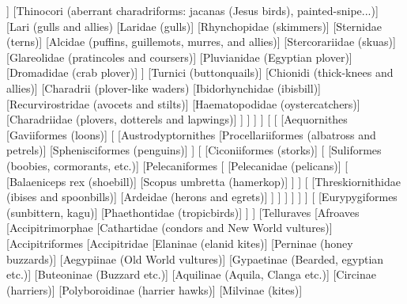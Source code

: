 \documentclass[tikz]{standalone}
\begin{document}
\begin{forest}
								]
								[{Thinocori (aberrant charadriforms: jacanas (Jesus birds), painted-snipe...)}]
								[{Lari (gulls and allies)}
									[{Laridae (gulls)}]
									[{Rhynchopidae (skimmers)}]
									[{Sternidae (terns)}]
									[{Alcidae (puffins, guillemots, murres, and allies)}]
									[{Stercorariidae (skuas)}]
									[{Glareolidae (pratincoles and coursers)}]
									[{Pluvianidae (Egyptian plover)}]
									[{Dromadidae (crab plover)}]
								]
								[{Turnici (buttonquails)}]
								[{Chionidi (thick-knees and allies)}]
								[{Charadrii (plover-like waders)}
									[{Ibidorhynchidae (ibisbill)}]
									[{Recurvirostridae (avocets and stilts)}]
									[{Haematopodidae (oystercatchers)}]
									[{Charadriidae (plovers, dotterels and lapwings)}]
								]
							]
		  				]
					]
		       			[
		 				[
							[{Aequornithes}
								[{Gaviiformes (loons)}]
								[
									[{Austrodyptornithes}
										[{Procellariiformes (albatross and petrels)}]
										[{Sphenisciformes (penguins)}]
									]
									[
										[{Ciconiiformes (storks)}]
										[
											[{Suliformes (boobies, cormorants, etc.)}]
											[{Pelecaniformes}
												[
													[{Pelecanidae (pelicans)}]
													[
														[{Balaeniceps rex (shoebill)}]
														[{Scopus umbretta (hamerkop)}]
													]
												]
												[
													[{Threskiornithidae (ibises and spoonbills)}]
													[{Ardeidae (herons and egrets)}]
												]
											]
										]
									]
								]
							]
			     				[
			     					[{Eurypygiformes (sunbittern, kagu)}]
			      					[{Phaethontidae (tropicbirds)}]
			     				]
						]
			  			[{Telluraves}  
			  				[{Afroaves}
							     	[{Accipitrimorphae}
									[{Cathartidae (condors and New World vultures)}]
								 	[{Accipitriformes}
										[{Accipitridae}
											[{Elaninae (elanid kites)}]
											[{Perninae (honey buzzards)}]
											[{Aegypiinae (Old World vultures)}]
											[{Gypaetinae (Bearded, egyptian etc.)}]
											[{Buteoninae (Buzzard etc.)}]
											[{Aquilinae (Aquila, Clanga etc.)}]
											[{Circinae (harriers)}]
											[{Polyboroidinae (harrier hawks)}]
											[{Milvinae (kites)}]

\end{forest}
\end{document}
